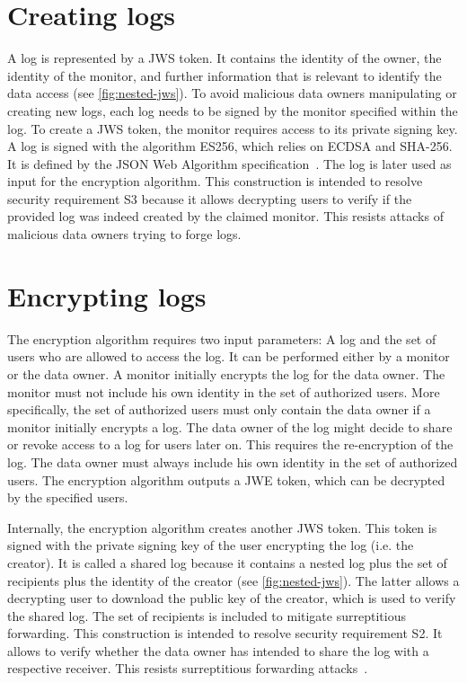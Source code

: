 \documentclass[../main.tex]{subfiles}
\begin{document}
\section{Creating logs}
\label{sec:signing}
A log is represented by a JWS token.
It contains the identity of the owner, the identity of the monitor, and further information that is relevant to identify the data access (see \cref{fig:nested-jws}).
To avoid malicious data owners manipulating or creating new logs, each log needs to be signed by the monitor specified within the log.
To create a JWS token, the monitor requires access to its private signing key.
A log is signed with the algorithm ES256, which relies on ECDSA and SHA-256.
It is defined by the JSON Web Algorithm specification~\cite{JWA2015}.
The log is later used as input for the encryption algorithm.
This construction is intended to resolve security requirement S3 because it allows decrypting users to verify if the provided log was indeed created by the claimed monitor.
This resists attacks of malicious data owners trying to forge logs.

\section{Encrypting logs}\label{sec:encrypting}

The encryption algorithm requires two input parameters: A log and the set of users who are allowed to access the log.
It can be performed either by a monitor or the data owner.
A monitor initially encrypts the log for the data owner.
The monitor must not include his own identity in the set of authorized users.
More specifically, the set of authorized users must only contain the data owner if a monitor initially encrypts a log.
The data owner of the log might decide to share or revoke access to a log for users later on.
This requires the re-encryption of the log.
The data owner must always include his own identity in the set of authorized users.
The encryption algorithm outputs a JWE token, which can be decrypted by the specified users.

Internally, the encryption algorithm creates another JWS token.
This token is signed with the private signing key of the user encrypting the log (i.e. the creator).
It is called a shared log because it contains a nested log plus the set of recipients plus the identity of the creator (see \cref{fig:nested-jws}).
The latter allows a decrypting user to download the public key of the creator, which is used to verify the shared log.
The set of recipients is included to mitigate surreptitious forwarding.
This construction is intended to resolve security requirement S2.
It allows to verify whether the data owner has intended to share the log with a respective receiver.
This resists surreptitious forwarding attacks~\cite{Davis2001}.
\end{document}
